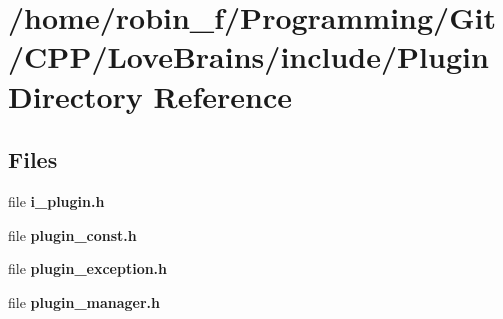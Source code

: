 \section{/home/robin\+\_\+f/\+Programming/\+Git/\+C\+P\+P/\+Love\+Brains/include/\+Plugin Directory Reference}
\label{dir_e516b15a6a0161fe9168688f94633618}
\subsection*{Files}
\begin{DoxyCompactItemize}
\item 
file {\bfseries i\+\_\+plugin.\+h}
\item 
file {\bfseries plugin\+\_\+const.\+h}
\item 
file {\bfseries plugin\+\_\+exception.\+h}
\item 
file {\bfseries plugin\+\_\+manager.\+h}
\end{DoxyCompactItemize}
